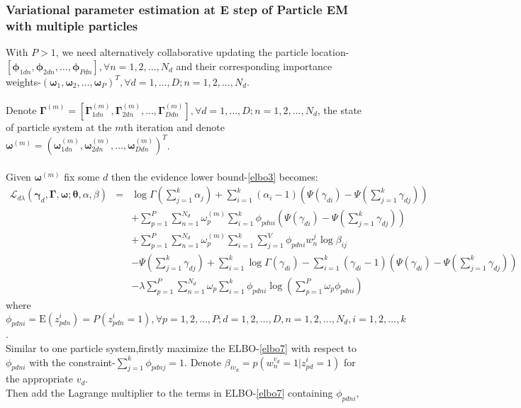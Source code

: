 \documentclass{article}
\newcommand{\be}{\begin{equation}}
\newcommand{\ee}{\end{equation}}
\newcommand{\bs}{\boldsymbol}
\newcommand{\ba}{\begin{array}}
\newcommand{\ea}{\end{array}}
\newcommand{\E}{\mathrm{E}}
\newcommand{\Sum}{\displaystyle\sum}
\begin{document}
\subsubsection{Variational parameter estimation at E step of Particle EM with multiple particles}
With $P>1$, we need alternatively collaborative updating the particle location-$[\bs{\phi}_{1dn},\bs{\phi}_{2dn},\ldots,\bs{\phi}_{Pdn}],\forall n=1,2,\ldots,N_d$ and their corresponding importance weights-$(\bs{\omega}_{1},\bs{\omega}_{2},\ldots,\bs{\omega}_{P})^T,\forall d=1,\ldots,D;n=1,2,\ldots,N_d$.\\
\\
Denote $\bs{\Gamma}^{(m)}=[\bs{\Gamma}_{1dn}^{(m)},\bs{\Gamma}_{2dn}^{(m)},\ldots,\bs{\Gamma}_{Ddn}^{(m)}],\forall d=1,\ldots,D;n=1,2,\ldots,N_d$, the state of  particle system at the $m$th iteration and denote $\bs{\omega}^{(m)}=(\bs{\omega}_{1dn}^{(m)},\bs{\omega}_{2dn}^{(m)},\ldots,\bs{\omega}_{Ddn}^{(m)})^T$.\\
\\
Given $\bs{\omega}^{(m)}$ fix some $d$ then the evidence lower bound-\ref{elbo3} becomes:\\
\be\label{elbo7}
\ba{rcl}
\mathcal{L}_{d\lambda}(\bs{\gamma}_d,\bs{\Gamma},\bs{\omega};\bs{\theta},\alpha,\beta)
&=&\log\Gamma(\sum_{j=1}^{k}\alpha_j)+\Sum_{i=1}^{k}(\alpha_i-1)(\Psi(\gamma_{di})-\Psi(\sum_{j=1}^{k}\gamma_{dj}))\\
&&+\Sum_{p=1}^{P}\Sum_{n=1}^{N_d}\omega_{p}^{(m)}\Sum_{i=1}^{k}\phi_{pdni}(\Psi(\gamma_{di})-\Psi(\sum_{j=1}^{k}\gamma_{dj}))\\
&&+\Sum_{p=1}^{P}\Sum_{n=1}^{N_d}\omega_{p}^{(m)}\Sum_{i=1}^{k}\Sum_{j=1}^{V}\phi_{pdni}w_n^j\log\beta_{ij}\\
&&-\Psi(\sum_{j=1}^{k}\gamma_{dj})+\Sum_{i=1}^{k}\log\Gamma(\gamma_{di})-\Sum_{i=1}^{k}(\gamma_{di}-1)(\Psi(\gamma_{di})-\Psi(\sum_{j=1}^{k}\gamma_{dj}))\\
&&-\lambda\Sum_{p=1}^{P}\Sum_{n=1}^{N_d}\omega_{p}\Sum_{i=1}^{k}\phi_{pdni}\log(\sum_{p=1}^{P}\omega_{p}\phi_{pdni})
\ea
\ee
where $\phi_{pdni}=\E(z_{pdn}^{i})=P(z_{pdn}^{i}=1),\forall p=1,2,\ldots,P;d=1,2,\ldots,D,n=1,2,\ldots,N_d,i=1,2,\ldots,k$.\\
Similar to one particle system,firstly maximize the ELBO-\ref{elbo7} with respect to $\phi_{pdni}$ with the constraint-$\sum_{j=1}^{k}\phi_{pdnj}=1$.
Denote $\beta_{iv_d}=p(w_n^{v_d}=1|z_{pd}^i=1)$ for the appropriate $v_d$.\\
Then  add the Lagrange multiplier to the terms in ELBO-\ref{elbo7} containing $\phi_{pdni}$,\\
\end{document}
